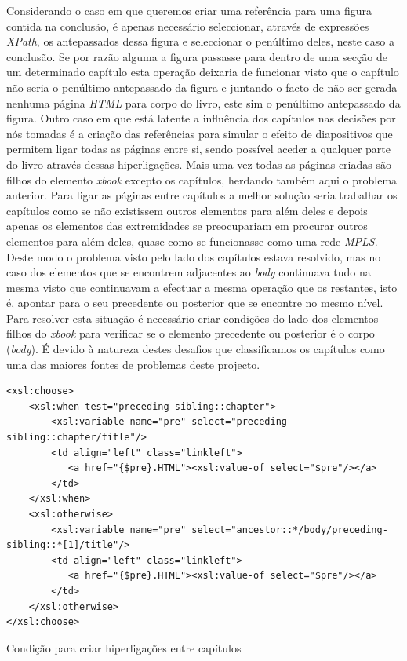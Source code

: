 \documentclass[a4paper]{article}
\begin{document}
\hspace{1cm}Considerando o caso em que queremos criar uma referência para uma figura contida na conclusão, é apenas necessário seleccionar, através de expressões \emph{XPath}, os antepassados dessa figura e seleccionar o penúltimo deles, neste caso a conclusão. Se por razão alguma a figura passasse para dentro de uma secção de um determinado capítulo esta operação deixaria de funcionar visto que o capítulo não seria o penúltimo antepassado da figura e juntando o facto de não ser gerada nenhuma página \emph{HTML} para corpo do livro, este sim o penúltimo antepassado da figura. Outro caso em que está latente a influência dos capítulos nas decisões por nós tomadas é a criação das referências para simular o efeito de diapositivos que permitem ligar todas as páginas entre si, sendo possível aceder a qualquer parte do livro através dessas hiperligações. Mais uma vez todas as páginas criadas são filhos do elemento \emph{xbook} excepto os capítulos, herdando também aqui o problema anterior. Para ligar as páginas entre capítulos a melhor solução seria trabalhar os capítulos como se não existissem outros elementos para além deles e depois apenas os elementos das extremidades se preocupariam em procurar outros elementos para além deles, quase como se funcionasse como uma rede \emph{MPLS}. Deste modo o problema visto pelo lado dos capítulos estava resolvido, mas no caso dos elementos que se encontrem adjacentes ao \emph{body} continuava tudo na mesma visto que continuavam a efectuar a mesma operação que os restantes, isto é, apontar para o seu precedente ou posterior que se encontre no mesmo nível. Para resolver esta situação é necessário criar condições do lado dos elementos filhos do \emph{xbook} para verificar se o elemento precedente ou posterior é o corpo (\emph{body}). É devido à natureza destes desafios que classificamos os capítulos como uma das maiores fontes de problemas deste projecto.\\
  
\begin{footnotesize}
\begin{lstlisting}
<xsl:choose>
    <xsl:when test="preceding-sibling::chapter">
        <xsl:variable name="pre" select="preceding-sibling::chapter/title"/>
        <td align="left" class="linkleft">
           <a href="{$pre}.HTML"><xsl:value-of select="$pre"/></a>
        </td>
    </xsl:when>
    <xsl:otherwise>
        <xsl:variable name="pre" select="ancestor::*/body/preceding-sibling::*[1]/title"/>
        <td align="left" class="linkleft">
           <a href="{$pre}.HTML"><xsl:value-of select="$pre"/></a>
        </td>
    </xsl:otherwise>
</xsl:choose>
\end{lstlisting}
\begin{center}
\caption{Condição para criar hiperligações entre capítulos}
\end{center}
\end{footnotesize}
\end{document}
